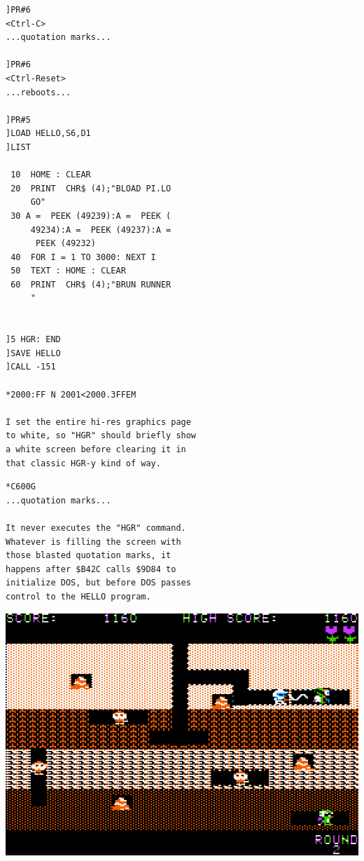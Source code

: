 \documentclass{article}
\begin{document}
\begin{verbatim}
]PR#6
<Ctrl-C>
...quotation marks...

]PR#6
<Ctrl-Reset>
...reboots...

]PR#5
]LOAD HELLO,S6,D1
]LIST

 10  HOME : CLEAR
 20  PRINT  CHR$ (4);"BLOAD PI.LO
     GO"
 30 A =  PEEK (49239):A =  PEEK (
     49234):A =  PEEK (49237):A =
      PEEK (49232)
 40  FOR I = 1 TO 3000: NEXT I
 50  TEXT : HOME : CLEAR
 60  PRINT  CHR$ (4);"BRUN RUNNER
     "


]5 HGR: END
]SAVE HELLO
]CALL -151

*2000:FF N 2001<2000.3FFEM

I set the entire hi-res graphics page
to white, so "HGR" should briefly show
a white screen before clearing it in
that classic HGR-y kind of way.
\end{verbatim}

\newpage

\begin{verbatim}
*C600G
...quotation marks...

It never executes the "HGR" command.
Whatever is filling the screen with
those blasted quotation marks, it
happens after $B42C calls $9D84 to
initialize DOS, but before DOS passes
control to the HELLO program.
\end{verbatim}

\vspace*{3\baselineskip}

\centerline{\includegraphics[width=.9\textwidth]{level2}}

\vspace*{\fill}
\end{document}
